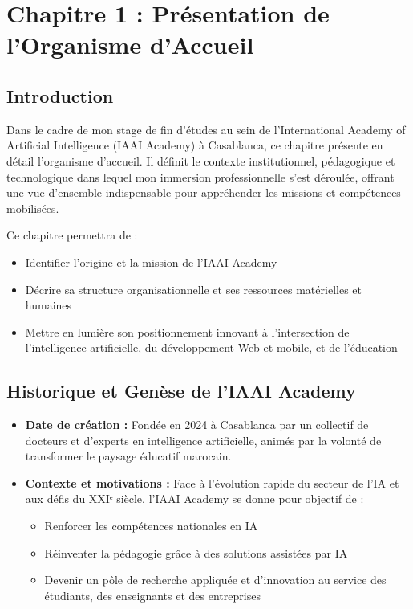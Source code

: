 \chapter*{Chapitre 1 : Présentation de l'Organisme d'Accueil}
\thispagestyle{fancy}
\setcounter{section}{0}
\newpage

\section{Introduction}

Dans le cadre de mon stage de fin d'études au sein de l'International Academy of Artificial Intelligence (IAAI Academy) à Casablanca, ce chapitre présente en détail l'organisme d'accueil. Il définit le contexte institutionnel, pédagogique et technologique dans lequel mon immersion professionnelle s'est déroulée, offrant une vue d'ensemble indispensable pour appréhender les missions et compétences mobilisées.

Ce chapitre permettra de :
\begin{itemize}
  \item Identifier l'origine et la mission de l'IAAI Academy
  \item Décrire sa structure organisationnelle et ses ressources matérielles et humaines
  \item Mettre en lumière son positionnement innovant à l'intersection de l'intelligence artificielle, du développement Web et mobile, et de l'éducation
\end{itemize}

\section{Historique et Genèse de l'IAAI Academy}

\begin{itemize}
  \item \textbf{Date de création :} Fondée en 2024 à Casablanca par un collectif de docteurs et d'experts en intelligence artificielle, animés par la volonté de transformer le paysage éducatif marocain.
  
  \item \textbf{Contexte et motivations :} Face à l'évolution rapide du secteur de l'IA et aux défis du XXIᵉ siècle, l'IAAI Academy se donne pour objectif de :
  \begin{itemize}
    \item Renforcer les compétences nationales en IA
    \item Réinventer la pédagogie grâce à des solutions assistées par IA
    \item Devenir un pôle de recherche appliquée et d'innovation au service des étudiants, des enseignants et des entreprises
  \end{itemize}
\end{itemize}

